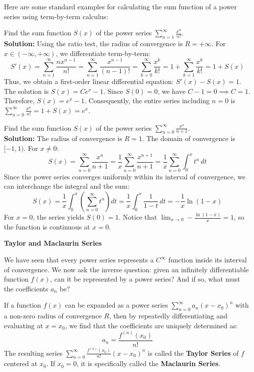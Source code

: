 Here are some standard examples for calculating the sum function of a power series using term-by-term calculus:

\begin{example}
Find the sum function $S(x)$ of the power series $\sum_{n=1}^{\infty} \frac{x^n}{n!}$.
\\ \textbf{Solution:} Using the ratio test, the radius of convergence is $R = +\infty$. For $x \in (-\infty, +\infty)$, we differentiate term-by-term:
\[ S'(x) = \sum_{n=1}^{\infty} \frac{n x^{n-1}}{n!} = \sum_{n=1}^{\infty} \frac{x^{n-1}}{(n-1)!} = \sum_{k=0}^{\infty} \frac{x^k}{k!} = 1 + \sum_{k=1}^{\infty} \frac{x^k}{k!} = 1 + S(x) \]
Thus, we obtain a first-order linear differential equation: $S'(x) - S(x) = 1$. The solution is $S(x) = C e^x - 1$.
Since $S(0) = 0$, we have $C - 1 = 0 \implies C = 1$. Therefore, $S(x) = e^x - 1$.
Consequently, the entire series including $n=0$ is $\sum_{n=0}^{\infty} \frac{x^n}{n!} = 1 + S(x) = e^x$.
\end{example}

\begin{example}
Find the sum function $S(x)$ of the power series $\sum_{n=0}^{\infty} \frac{x^n}{n+1}$.
\\ \textbf{Solution:} The radius of convergence is $R = 1$. The domain of convergence is $[-1, 1)$.
For $x \neq 0$:
\[ S(x) = \sum_{n=0}^{\infty} \frac{x^n}{n+1} = \frac{1}{x} \sum_{n=0}^{\infty} \frac{x^{n+1}}{n+1} = \frac{1}{x} \sum_{n=0}^{\infty} \int_0^x t^n \, dt \]
Since the power series converges uniformly within its interval of convergence, we can interchange the integral and the sum:
\[ S(x) = \frac{1}{x} \int_0^x \left(\sum_{n=0}^{\infty} t^n\right) dt = \frac{1}{x} \int_0^x \frac{1}{1-t} \, dt = -\frac{1}{x} \ln(1-x) \]
For $x = 0$, the series yields $S(0) = 1$. Notice that $\lim_{x \to 0} -\frac{\ln(1-x)}{x} = 1$, so the function is continuous at $x = 0$.
\end{example}

\textbf{Taylor and Maclaurin Series}

We have seen that every power series represents a $C^\infty$ function inside its interval of convergence. We now ask the inverse question: given an infinitely differentiable function $f(x)$, can it be represented by a power series? And if so, what must the coefficients $a_n$ be?


\begin{theorem}
If a function $f(x)$ can be expanded as a power series $\sum_{n=0}^{\infty} a_n (x-x_0)^n$ with a non-zero radius of convergence $R$, then by repeatedly differentiating and evaluating at $x=x_0$, we find that the coefficients are uniquely determined as:
\[ a_n = \frac{f^{(n)}(x_0)}{n!} \]
The resulting series $\sum_{n=0}^{\infty} \frac{f^{(n)}(x_0)}{n!} (x-x_0)^n$ is called the \textbf{Taylor Series} of $f$ centered at $x_0$. If $x_0=0$, it is specifically called the \textbf{Maclaurin Series}.
\end{theorem}

